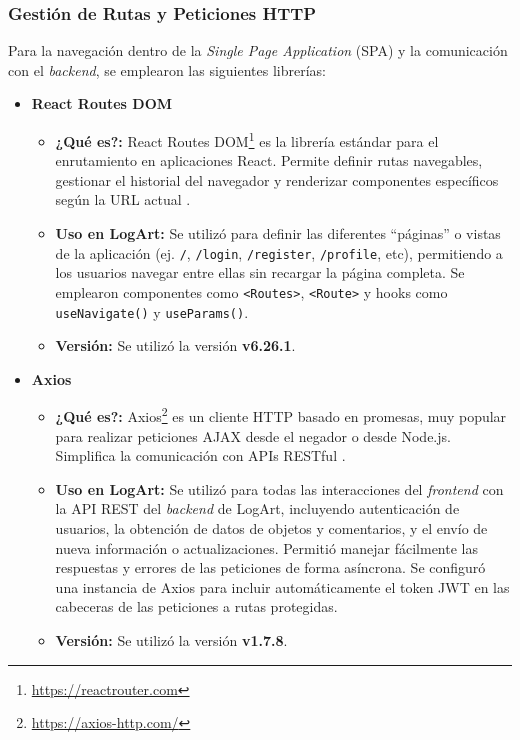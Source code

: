 \subsubsection{Gestión de Rutas y Peticiones HTTP}
\label{sec:rutasPeticionesFrontend}

Para la navegación dentro de la \textit{Single Page Application} (SPA) y la comunicación con el \textit{backend}, se emplearon las siguientes librerías:

\begin{itemize}
    \item \textbf{React Routes DOM}
        \begin{itemize}
            \item \textbf{¿Qué es?:} React Routes DOM\footnote{\url{https://reactrouter.com}} es la librería estándar para el enrutamiento en aplicaciones React. Permite definir rutas navegables, gestionar el historial del navegador y renderizar componentes específicos según la URL actual \cite{urianvieraReactRouterDomGuia}.
            \item \textbf{Uso en LogArt:} Se utilizó para definir las diferentes ``páginas'' o vistas de la aplicación (ej. \texttt{/}, \texttt{/login}, \texttt{/register}, \texttt{/profile}, etc), permitiendo a los usuarios navegar entre ellas sin recargar la página completa. Se emplearon componentes como \texttt{<Routes>}, \texttt{<Route>} y hooks como \texttt{useNavigate()} y \texttt{useParams()}.
            \item \textbf{Versión:} Se utilizó la versión \textbf{v6.26.1}.
        \end{itemize}
    \vspace{0.3cm}
    \item \textbf{Axios}
        \begin{itemize}
            \item \textbf{¿Qué es?:} Axios\footnote{\url{https://axios-http.com/}} es un cliente HTTP basado en promesas, muy popular para realizar peticiones AJAX desde el negador o desde Node.js. Simplifica la comunicación con APIs RESTful \cite{desarrollowebAxios}.
            \item \textbf{Uso en LogArt:} Se utilizó para todas las interacciones del \textit{frontend} con la API REST del \textit{backend} de LogArt, incluyendo autenticación de usuarios, la obtención de datos de objetos y comentarios, y el envío de nueva información o actualizaciones. Permitió manejar fácilmente las respuestas y errores de las peticiones de forma asíncrona. Se configuró una instancia de Axios para incluir automáticamente el token JWT en las cabeceras de las peticiones a rutas protegidas.
            \item \textbf{Versión:} Se utilizó la versión \textbf{v1.7.8}.
        \end{itemize}
\end{itemize}

